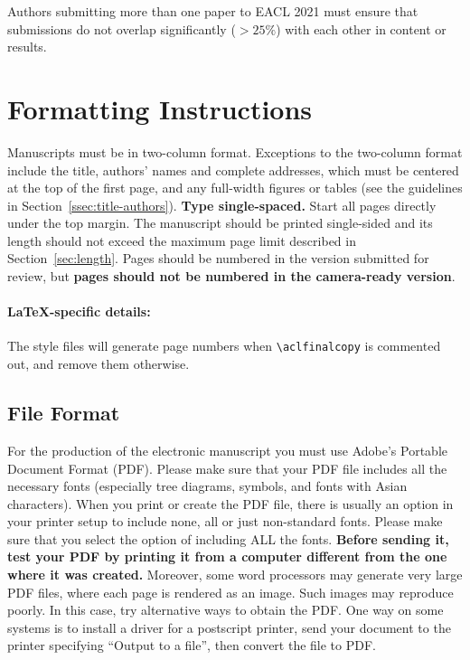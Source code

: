 \documentclass[11pt,a4paper]{article}
\begin{document}
Authors submitting more than one paper to EACL 2021 must ensure that submissions do not overlap significantly ($>25\%$) with each other in content or results.



\section{Formatting Instructions}

Manuscripts must be in two-column format.
Exceptions to the two-column format include the title, authors' names and complete addresses, which must be centered at the top of the first page, and any full-width figures or tables (see the guidelines in Section~\ref{ssec:title-authors}).
\textbf{Type single-spaced.}
Start all pages directly under the top margin.
The manuscript should be printed single-sided and its length should not exceed the maximum page limit described in Section~\ref{sec:length}.
Pages should be numbered in the version submitted for review, but \textbf{pages should not be numbered in the camera-ready version}.

\paragraph{\LaTeX-specific details:}
The style files will generate page numbers when {\small\verb|\aclfinalcopy|} is commented out, and remove them otherwise.


\subsection{File Format}
\label{sect:pdf}

For the production of the electronic manuscript you must use Adobe's Portable Document Format (PDF).
Please make sure that your PDF file includes all the necessary fonts (especially tree diagrams, symbols, and fonts with Asian characters).
When you print or create the PDF file, there is usually an option in your printer setup to include none, all or just non-standard fonts.
Please make sure that you select the option of including ALL the fonts.
\textbf{Before sending it, test your PDF by printing it from a computer different from the one where it was created.}
Moreover, some word processors may generate very large PDF files, where each page is rendered as an image.
Such images may reproduce poorly.
In this case, try alternative ways to obtain the PDF.
One way on some systems is to install a driver for a postscript printer, send your document to the printer specifying ``Output to a file'', then convert the file to PDF.
\end{document}
